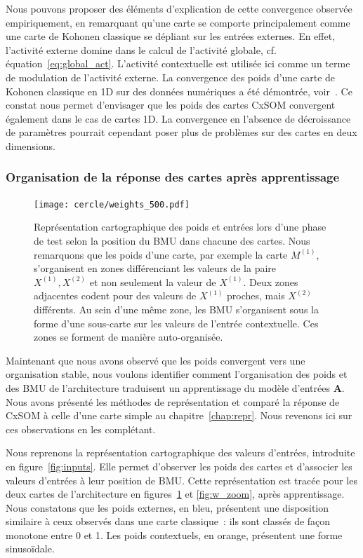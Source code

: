 \documentclass[../main]{subfiles}
\begin{document}
Nous pouvons proposer des éléments d'explication de cette convergence observée empiriquement, en remarquant qu'une carte se comporte principalement comme une carte de Kohonen classique se dépliant sur les entrées externes. En effet, l'activité externe domine dans le calcul de l'activité globale, cf. équation~\ref{eq:global_act}.
L'activité contextuelle est utilisée ici comme un terme de modulation de l'activité externe.
La convergence des poids d'une carte de Kohonen classique en 1D sur des données numériques a été démontrée, voir~\cite{Cottrell1998TheoreticalAO}. 
Ce constat nous permet d'envisager que les poids des cartes CxSOM convergent également dans le cas de cartes 1D.
La convergence en l'absence de décroissance de paramètres pourrait cependant poser plus de problèmes sur des cartes en deux dimensions.

\subsubsection{Organisation de la réponse des cartes après apprentissage}
\begin{figure}[ht]
	\centering\texttt{[image: cercle/weights\_500.pdf]}
	\caption{Représentation cartographique des poids et entrées lors d'une phase de test selon la position du BMU dans chacune des cartes. Nous remarquons que les poids d'une carte, par exemple la carte $M^{(1)}$, s'organisent en zones différenciant les valeurs de la paire $X^{(1)}, X^{(2)}$ et non seulement la valeur de $X^{(1)}$. 
	Deux zones adjacentes codent pour des valeurs de $X^{(1)}$ proches, mais $X^{(2)}$ différents. 
	Au sein d'une même zone, les BMU s'organisent sous la forme d'une sous-carte sur les valeurs de l'entrée contextuelle. Ces zones se forment de manière auto-organisée. \label{fig:w}}
\end{figure}

Maintenant que nous avons observé que les poids convergent vers une organisation stable, nous voulons identifier comment l'organisation des poids et des BMU de l'architecture traduisent un apprentissage du modèle d'entrées \textbf{A}.
Nous avons présenté les méthodes de représentation et comparé la réponse de CxSOM à celle d'une carte simple au chapitre~\ref{chap:repr}. Nous revenons ici sur ces observations en les complétant.

Nous reprenons la représentation cartographique des valeurs d'entrées, introduite en figure~\ref{fig:inputs}. Elle permet d'observer les poids des cartes et d'associer les valeurs d'entrées à leur position de BMU.
Cette représentation est tracée pour les deux cartes de l'architecture en figures~\ref{fig:w} et \ref{fig:w_zoom}, après apprentissage.
Nous constatons que les poids externes, en bleu, présentent une disposition similaire à ceux observés dans une carte classique~: ils sont classés de façon monotone entre 0 et 1. Les poids contextuels, en orange, présentent une forme sinusoïdale.
\end{document}
